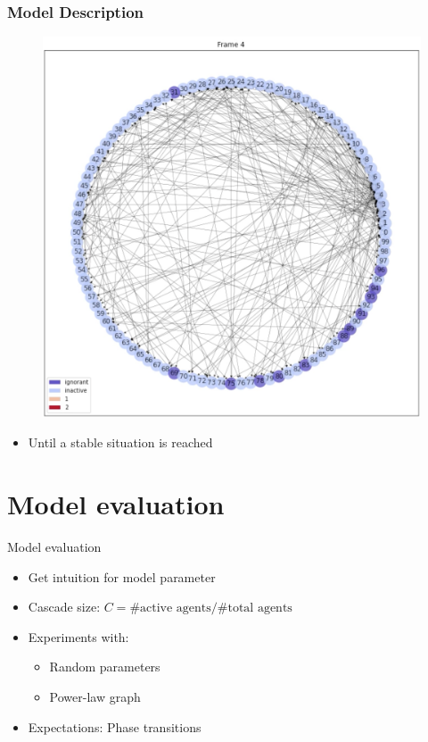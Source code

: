 \documentclass{beamer}
\begin{document}
\begin{frame}
\frametitle{Model Description}

\begin{center}
\begin{figure}
\includegraphics[scale=0.2]{images/frame4.png}
\end{figure}
\end{center}

\begin{itemize}
\item<1-> Until a stable situation is reached
\end{itemize}

\end{frame}



\section{Model evaluation}

\begin{frame}{Model evaluation}
    \begin{itemize}
        \item Get intuition for model parameter
        \item Cascade size: $C = \text{\#active agents} / \text{\#total agents}$
        \item Experiments with:
        \begin{itemize}
            \item Random parameters
            \item Power-law graph
        \end{itemize}
        \vspace{1cm}
        \item Expectations: Phase transitions
    \end{itemize}
\end{frame}
\end{document}
